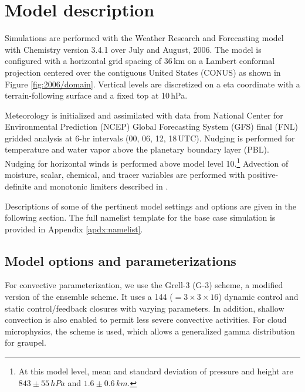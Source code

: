 \section{Model description}\label{sec:2006/method}


Simulations are performed with the Weather Research and Forecasting model \citep{Skamarock:2008xx} with Chemistry
\citep[WRF-Chem;][]{Grell:2005fv} version 3.4.1 over July and August, 2006. The model is configured with a horizontal grid
spacing of 36\,\unit{km} on a Lambert conformal projection centered over the contiguous United States (CONUS) as shown
in Figure \ref{fig:2006/domain}. Vertical levels are discretized on a eta coordinate with a terrain-following surface and a fixed
top at 10\,\unit{hPa}.

Meteorology is initialized and assimilated with data from National Center for Environmental Prediction (NCEP) Global Forecasting
System (GFS) final (FNL) gridded analysis at 6-hr intervals (00, 06, 12, 18\,\unit{UTC}). Nudging is performed for temperature and
water vapor above the planetary boundary layer (PBL). Nudging for horizontal winds is performed above model level 10.\footnote{At
this model level, mean and standard deviation of pressure and height are $843\pm55\,\unit{hPa}$ and $1.6\pm0.6\,\unit{km}$.}
Advection of moisture, scalar, chemical, and tracer variables are performed with positive-definite and monotonic limiters described in
\citet{Skamarock:2006wm}.

Descriptions of some of the pertinent model settings and options are given in the following section. The full namelist
template for the base case simulation is provided in Appendix \ref{apdx:namelist}.

\subsection{Model options and parameterizations}\label{ssec:2006/method/settings}

	For convective parameterization, we use the Grell-3 (G-3) scheme, a modified version of the \citet{Grell:2002bs} ensemble scheme. It uses a 144 ($=3\times3\times16$) dynamic control and static control/feedback closures with varying parameters. In addition, shallow convection is also enabled to permit less severe convective activities. For cloud microphysics, the \citet{Thompson:2008vn} scheme is used, which allows a generalized gamma distribution for graupel.


